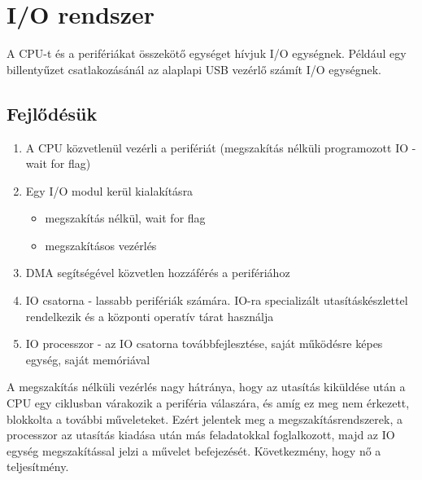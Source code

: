
\chapter{I/O rendszer}

A CPU-t és a perifériákat összekötő egységet hívjuk I/O egységnek.
Például egy billentyűzet csatlakozásánál az alaplapi USB vezérlő számít I/O egységnek.

\section{Fejlődésük}
\begin{enumerate}
    \item A CPU közvetlenül vezérli a perifériát (megszakítás nélküli programozott IO - wait for flag)
    \item Egy I/O modul kerül kialakításra
    \begin{itemize}
        \item megszakítás nélkül, wait for flag
        \item megszakításos vezérlés
    \end{itemize}
    \item DMA segítségével közvetlen hozzáférés a perifériához
    \item IO csatorna - lassabb perifériák számára. IO-ra specializált utasításkészlettel rendelkezik és a központi operatív tárat használja
    \item IO processzor - az IO csatorna továbbfejlesztése, saját működésre képes egység, saját memóriával
\end{enumerate}
A megszakítás nélküli vezérlés nagy hátránya, hogy az utasítás kiküldése után a CPU egy ciklusban várakozik a periféria válaszára, és amíg ez meg nem érkezett, blokkolta a további műveleteket.
Ezért jelentek meg a megszakításrendszerek, a processzor az utasítás kiadása után más feladatokkal foglalkozott, majd az IO egység megszakítással jelzi a művelet befejezését.
Következmény, hogy nő a teljesítmény.